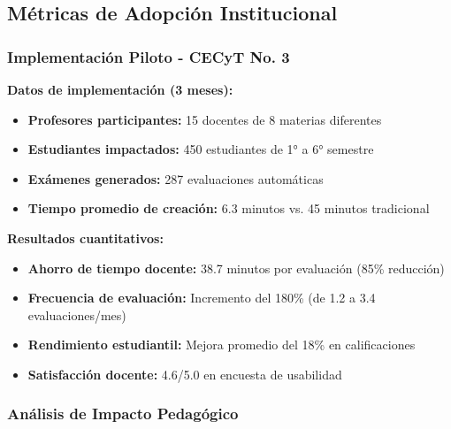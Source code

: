 \documentclass[12pt,a4paper]{report}
\begin{document}
\subsection{Métricas de Adopción Institucional}

\subsubsection{Implementación Piloto - CECyT No. 3}

\textbf{Datos de implementación (3 meses):}
\begin{itemize}
\item \textbf{Profesores participantes:} 15 docentes de 8 materias diferentes
\item \textbf{Estudiantes impactados:} 450 estudiantes de 1° a 6° semestre
\item \textbf{Exámenes generados:} 287 evaluaciones automáticas
\item \textbf{Tiempo promedio de creación:} 6.3 minutos vs. 45 minutos tradicional
\end{itemize}

\textbf{Resultados cuantitativos:}
\begin{itemize}
\item \textbf{Ahorro de tiempo docente:} 38.7 minutos por evaluación (85\% reducción)
\item \textbf{Frecuencia de evaluación:} Incremento del 180\% (de 1.2 a 3.4 evaluaciones/mes)
\item \textbf{Rendimiento estudiantil:} Mejora promedio del 18\% en calificaciones
\item \textbf{Satisfacción docente:} 4.6/5.0 en encuesta de usabilidad
\end{itemize}

\subsubsection{Análisis de Impacto Pedagógico}
\end{document}
